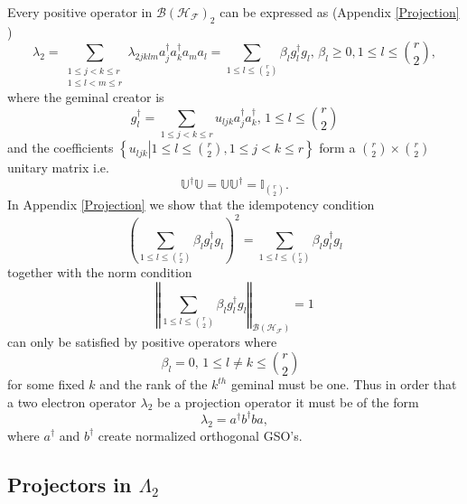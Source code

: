 \documentclass[aps,preprint,amsfonts,amssymb,showpacs,showkeys]{revtex4}%
\begin{document}
Every positive operator in $\mathcal{B}\left(  \mathcal{H}_{\mathcal{F}%
}\right)  _{2}$ can be expressed as (Appendix \ref{Projection} )
\begin{equation}
\lambda_{2}=\sum_{\substack{1\leq j<k\leq r\\1\leq l<m\leq r}}\lambda
_{2jklm}a_{j}^{\dagger}a_{k}^{\dagger}a_{m}a_{l}=\sum_{1\leq l\leq\binom{r}%
{2}}\beta_{l}g_{l}^{\dagger}g_{l},\,\beta_{l}\geq0,1\leq l\leq\binom{r}{2},
\end{equation}
where the geminal creator is
\begin{equation}
g_{l}^{\dagger}=\sum_{1\leq j<k\leq r}u_{ljk}a_{j}^{\dagger}a_{k}^{\dagger
},\,1\leq l\leq\binom{r}{2}%
\end{equation}
and the coefficients $\left\{  \left.  u_{ljk}\right\vert 1\leq l\leq\binom
{r}{2},1\leq j<k\leq r\right\}  $ form a $\binom{r}{2}\times\binom{r}{2}$
unitary matrix i.e.
\begin{equation}
\mathbb{U}^{\dagger}\mathbb{U}=\mathbb{UU}^{\dagger}=\mathbb{I}_{\binom{r}{2}%
}.
\end{equation}
In Appendix \ref{Projection} we show that the idempotency condition
\begin{equation}
\left(  \sum_{1\leq l\leq\binom{r}{2}}\beta_{l}g_{l}^{\dagger}g_{l}\right)
^{2}=\sum_{1\leq l\leq\binom{r}{2}}\beta_{l}g_{l}^{\dagger}g_{l}%
\end{equation}
together with the norm condition
\begin{equation}
\left\Vert \sum_{1\leq l\leq\binom{r}{2}}\beta_{l}g_{l}^{\dagger}%
g_{l}\right\Vert _{\mathcal{B}\left(  \mathcal{H}_{\mathcal{F}}\right)  }=1
\end{equation}
can only be satisfied by positive operators where
\begin{equation}
\beta_{l}=0,\,1\leq l\neq k\leq\binom{r}{2}\text{ }%
\end{equation}
for some fixed $k$ and the rank of the $k^{th}$ geminal must be one. Thus in
order that a two electron operator $\lambda_{2}$ be a projection operator it
must be of the form
\begin{equation}
\lambda_{2}=a^{\dagger}b^{\dagger}ba,
\end{equation}
where $a^{\dagger}$ and $b^{\dagger}$ create normalized orthogonal GSO's.

\subsection{Projectors in $\Lambda_{2}$ \label{Proj1&2}}
\end{document}
